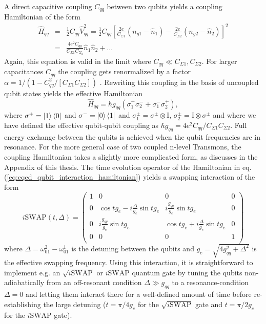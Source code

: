 A direct capacitive coupling $C_{qq}$ between two qubits yields a coupling Hamiltonian of the form
%
\begin{eqnarray}
\hat{H}_{qq} & = & \frac{1}{2}C_{qq}\hat{V}_{qq}^2 = \frac{1}{2}C_{qq}\left[\frac{2e}{C_{\Sigma 1}}(n_{g1}-\hat{n}_1)-\frac{2e}{C_{\Sigma 2}}(n_{g2}-\hat{n}_2)\right]^2 \\
& = & \frac{4e^2 C_{qq}}{C_{\Sigma 1}C_{\Sigma_2}}\hat{n}_1\hat{n}_2+\hdots \label{eq:cqed_capacitive_coupling}
\end{eqnarray}
%
Again, this equation is valid in the limit where $C_{qq} \ll C_{\Sigma 1},C_{\Sigma 2}$. For larger capacitances $C_{qq}$ the coupling gets renormalized by a factor $\alpha = 1/(1-C_{qq}^2/[C_{\Sigma 1}C_{\Sigma 2}])$ \citep{nguyen_cooper_2008}. Rewriting this coupling in the basis of uncoupled qubit states yields the effective Hamiltonian
%
\begin{equation}
\hat{H}_{qq} = \hbar g_{qq}\left(\sigma^+_1\sigma^-_2+\sigma^-_1\sigma^+_2\right), \label{eq:cqed_qubit_interaction_hamiltonian}
\end{equation}
%
where $\sigma^+=\left| 1 \right>\left< 0 \right|$ and $\sigma^-=\left| 0 \right>\left< 1 \right|$ and $\sigma_1^\pm=\sigma^\pm\otimes \mathrm{I}$, $\sigma_2^\pm = \mathrm{I}\otimes \sigma^\pm$ and where we have defined the effective qubit-qubit coupling as $\hbar g_{qq} = 4e^2 C_{qq}/C_{\Sigma 1}C_{\Sigma 2}$. Full energy exchange between the qubits is achieved when the qubit frequencies are in resonance. For the more general case of two coupled n-level Transmons, the coupling Hamiltonian takes a slightly more complicated form, as discusses in the Appendix of this thesis. The time evolution operator of the Hamiltonian in eq. (\ref{eq:cqed_qubit_interaction_hamiltonian}) yields a swapping interaction of the form
%
\begin{equation}
i\mathrm{SWAP}(t,\Delta) = \left(
			\begin{array}{cccc}
				1 & 0 & 0 & 0 \\
				0 & \cos{t g_{e}}-i\frac{\Delta}{g_e}\sin{t g_{e}} & i \frac{g_{qq}}{g_e}\sin{t g_{e}} & 0 \\
				0 & i\frac{g_{qq}}{g_e}\sin{t g_{e}} & \cos{t g_{e}}+i\frac{\Delta}{g_{e}}\sin{t g_{e}} & 0 \\
				0 & 0 & 0 & 1 \\
			\end{array}
	\right) \label{eq:swap_with_detuning}
\end{equation}
%
where $\Delta = \omega_{01}^2-\omega_{01}^1$ is the detuning between the qubits and $g_e = \sqrt{4g_{qq}^2+\Delta^2}$ is the effective swapping frequency. Using this interaction, it is straightforward to implement e.g. an $\sqrt{i\mathrm{SWAP}}$ or $i\mathrm{SWAP}$ quantum gate by tuning the qubits non-adiabatically from an off-resonant condition $\Delta \gg g_{qq}$ to a resonance-condition $\Delta = 0$ and letting them interact there for a well-defined amount of time before re-establishing the large detuning ($t=\pi/4g_e$ for the $\sqrt{i\mathrm{SWAP}}$ gate and $t=\pi/2g_e$ for the $i\mathrm{SWAP}$ gate).

